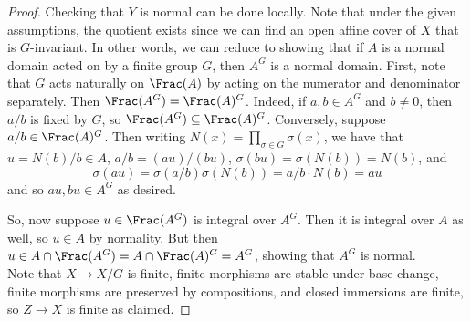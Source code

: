 \begin{proof}
	Checking that $Y$ is normal can be done locally. Note that under the given assumptions, the quotient exists since we can find an open affine cover of $X$ that is $G$-invariant. In other words, we can reduce to showing that if $A$ is a normal domain acted on by a finite group $G$, then $A^G$ is a normal domain. First, note that $G$ acts naturally on $\Frac(A)$ by acting on the numerator and denominator separately. Then $\Frac(A^G) = \Frac(A)^G$. Indeed, if $a,b \in A^G$ and $b \neq 0$, then $a/b$ is fixed by $G$, so $\Frac(A^G) \subseteq \Frac(A)^G$. Conversely, suppose $a/b \in \Frac(A)^G$. Then writing $N(x) = \prod_{\sigma \in G} \sigma(x)$, we have that $u = N(b)/b \in A$, $a/b = (au)/(bu)$, $\sigma(bu) = \sigma(N(b)) = N(b)$, and
	\[ \sigma(au) = \sigma(a/b)\sigma(N(b)) = a/b \cdot N(b) = au \]
	and so $au,bu \in A^G$ as desired.
	
	So, now suppose $u \in \Frac(A^G)$ is integral over $A^G$. Then it is integral over $A$ as well, so $u \in A$ by normality. But then $u \in A \cap \Frac(A^G) = A \cap \Frac(A)^G = A^G$, showing that $A^G$ is normal. \\
	
	Note that $X \to X/G$ is finite, finite morphisms are stable under base change, finite morphisms are preserved by compositions, and closed immersions are finite, so $Z \to X$ is finite as claimed.
\end{proof}
